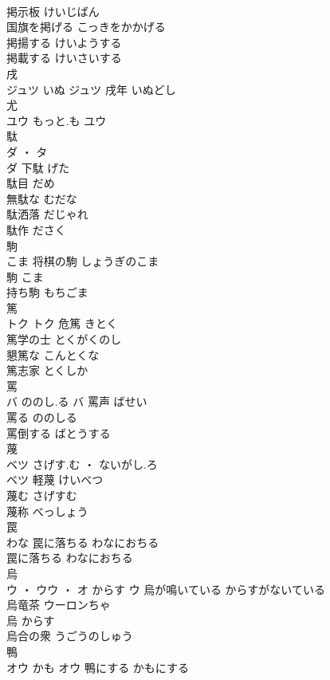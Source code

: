 \documentclass[8pt]{extreport}
\begin{document}
\begin{CJK}{UTF8}{min}
\\	掲示板	けいじばん	
\\	国旗を掲げる	こっきをかかげる	
\\	掲揚する	けいようする	
\\	掲載する	けいさいする	
\\	戌	
\\	ジュツ	いぬ	ジュツ	戌年	いぬどし	
\\	尤	
\\	ユウ	もっと.も	ユウ																																			
\\	駄	
\\	ダ ・ タ
\\	ダ	下駄	げた	
\\	駄目	だめ	
\\	無駄な	むだな	
\\	駄洒落	だじゃれ	
\\	駄作	ださく	
\\	駒	
\\	こま		将棋の駒	しょうぎのこま	
\\	駒	こま	
\\	持ち駒	もちごま	
\\	篤	
\\	トク		トク	危篤	きとく	
\\	篤学の士	とくがくのし	
\\	懇篤な	こんとくな	
\\	篤志家	とくしか	
\\	罵	
\\	バ	ののし.る	バ	罵声	ばせい	
\\	罵る	ののしる	
\\	罵倒する	ばとうする	
\\	蔑	
\\	ベツ	さげす.む ・ ないがし.ろ
\\	ベツ	軽蔑	けいべつ	
\\	蔑む	さげすむ	
\\	蔑称	べっしょう	
\\	罠	
\\	わな		罠に落ちる	わなにおちる	
\\	罠に落ちる	わなにおちる	
\\	烏	
\\	ウ ・ ウウ ・ オ	からす	ウ	烏が鳴いている	からすがないている	
\\	烏竜茶	ウーロンちゃ	
\\	烏	からす	
\\	烏合の衆	うごうのしゅう	
\\	鴨	
\\	オウ	かも	オウ	鴨にする	かもにする	

\end{CJK}
\end{document}
